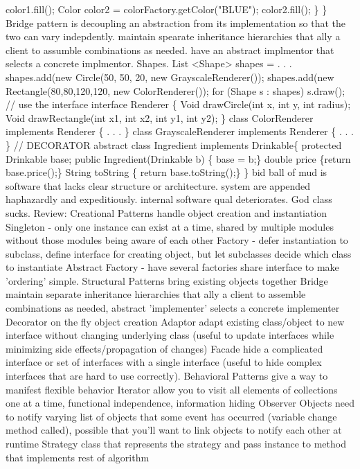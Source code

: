 \documentclass[10pt]{article}
\begin{document}
\begin{landscape}
\begin{multicols*}{6}
color1.fill();
Color color2 = colorFactory.getColor("BLUE");
color2.fill();
\}
\}
Bridge pattern is decoupling an abstraction from its implementation so that the two can vary indepdently. maintain spearate inheritance hierarchies that ally a client to assumble combinations as needed. have an abstract implmentor that selects a concrete implmentor. Shapes. 
List
<Shape>
shapes = . . .
shapes.add(new Circle(50, 50, 20, new GrayscaleRenderer());
shapes.add(new Rectangle(80,80,120,120,
new ColorRenderer());
for (Shape s : shapes)
s.draw(); // use the interface
interface Renderer \{
Void drawCircle(int x, int y, int radius); Void drawRectangle(int x1, int x2,
int y1, int y2);
\} class ColorRenderer implements Renderer \{
. . . \}
class GrayscaleRenderer implements Renderer \{
. . . \}
// DECORATOR
abstract class Ingredient implements Drinkable\{
protected Drinkable base; public Ingredient(Drinkable b) \{
base = b;\}
double price \{return base.price();\} String toString \{
return base.toString();\}
\}
bid ball of mud is software that lacks clear structure or architecture. system are appended haphazardly and expeditiously. internal software qual deteriorates. God class sucks. 
Review: Creational Patterns handle object creation and instantiation Singleton - only one instance can exist at a time, shared by multiple modules without those modules being aware of each other Factory - defer instantiation to subclass, define interface for creating object, but let subclasses decide which class to instantiate Abstract Factory - have several factories share interface to make 'ordering' simple. Structural Patterns bring existing objects together Bridge maintain separate inheritance hierarchies that ally a client to assemble combinations as needed, abstract 'implementer' selects a concrete implementer Decorator on the fly object creation Adaptor adapt existing class/object to new interface without changing underlying class (useful to update interfaces while minimizing side effects/propagation of changes) Facade hide a complicated interface or set of interfaces with a single interface (useful to hide complex interfaces that are hard to use correctly). Behavioral Patterns give a way to manifest flexible behavior Iterator allow you to visit all elements of collections one at a time, functional independence, information hiding Observer Objects need to notify varying list of objects that some event has occurred (variable change method called), possible that you'll want to link objects to notify each other at runtime Strategy class that represents the strategy and pass instance to method that implements rest of algorithm	


\end{multicols*}
\end{landscape}
\end{document}
